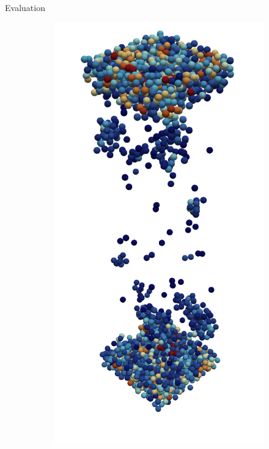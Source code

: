 \begin{frame}[c]{Evaluation}{}
{\begin{figure}[htpb]
\begin{subfigure}[c]{.2\textwidth}
				\vspace{-2cm}
			\end{subfigure}%
			\begin{subfigure}[c]{.2\textwidth}
				\centering
				\vspace{-1cm}
				\includegraphics[width=\textwidth]{exploding-liquid/render/t11000.png}

\end{subfigure}
\end{figure}}
\end{frame}
